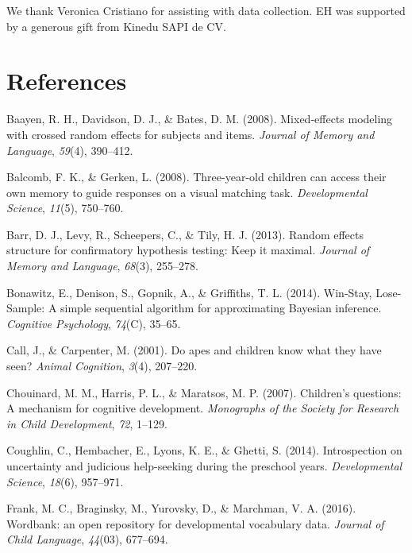 \documentclass[english,man]{apa6}
\theoremstyle{definition}
\theoremstyle{definition}
\theoremstyle{definition}
\theoremstyle{remark}
\begin{document}
We thank Veronica Cristiano for assisting with data collection. EH was
supported by a generous gift from Kinedu SAPI de CV.

\section{References}\label{references}

\setlength{\parindent}{-0.1in} \setlength{\leftskip}{0.125in} \noindent

\hypertarget{refs}{}
\hypertarget{ref-Baayen2008}{}
Baayen, R. H., Davidson, D. J., \& Bates, D. M. (2008). Mixed-effects
modeling with crossed random effects for subjects and items.
\emph{Journal of Memory and Language}, \emph{59}(4), 390--412.

\hypertarget{ref-Balcomb2008}{}
Balcomb, F. K., \& Gerken, L. (2008). Three-year-old children can access
their own memory to guide responses on a visual matching task.
\emph{Developmental Science}, \emph{11}(5), 750--760.

\hypertarget{ref-Barr2013}{}
Barr, D. J., Levy, R., Scheepers, C., \& Tily, H. J. (2013). Random
effects structure for confirmatory hypothesis testing: Keep it maximal.
\emph{Journal of Memory and Language}, \emph{68}(3), 255--278.

\hypertarget{ref-Bonawitz2014}{}
Bonawitz, E., Denison, S., Gopnik, A., \& Griffiths, T. L. (2014).
Win-Stay, Lose-Sample: A simple sequential algorithm for approximating
Bayesian inference. \emph{Cognitive Psychology}, \emph{74}(C), 35--65.

\hypertarget{ref-Call2001}{}
Call, J., \& Carpenter, M. (2001). Do apes and children know what they
have seen? \emph{Animal Cognition}, \emph{3}(4), 207--220.

\hypertarget{ref-Chouinard2007}{}
Chouinard, M. M., Harris, P. L., \& Maratsos, M. P. (2007). Children's
questions: A mechanism for cognitive development. \emph{Monographs of
the Society for Research in Child Development}, \emph{72}, 1--129.

\hypertarget{ref-Coughlin2014}{}
Coughlin, C., Hembacher, E., Lyons, K. E., \& Ghetti, S. (2014).
Introspection on uncertainty and judicious help-seeking during the
preschool years. \emph{Developmental Science}, \emph{18}(6), 957--971.

\hypertarget{ref-Frank2016}{}
Frank, M. C., Braginsky, M., Yurovsky, D., \& Marchman, V. A. (2016).
Wordbank: an open repository for developmental vocabulary data.
\emph{Journal of Child Language}, \emph{44}(03), 677--694.
\end{document}
